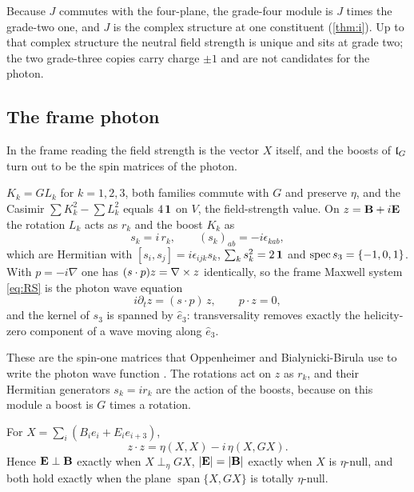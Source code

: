 Because $J$ commutes with the four-plane, the grade-four module is $J$ times the grade-two one, and $J$ is the complex structure at
one constituent (\cref{thm:i}). Up to that complex structure the neutral field strength is unique and sits at grade two; the two
grade-three copies carry charge $\pm1$ and are not candidates for the photon.

\subsection{The frame photon}

In the frame reading the field strength is the vector $X$ itself, and the boosts of $\mathfrak l_G$ turn out to be the spin matrices of the
photon.

\begin{proposition}
\label{prop:spinmatrices}
$K_k=GL_k$ for $k=1,2,3$, both families commute with $G$ and preserve $\eta$, and the Casimir $\sum K_k^2-\sum L_k^2$ equals $4\,\mathbf 1$ on
$V$, the field-strength value. On $z=\mathbf B+i\mathbf E$ the rotation $L_k$ acts as $r_k$ and the boost $K_k$ as
\[
s_k=i\,r_k,\qquad (s_k)_{ab}=-i\epsilon_{kab},
\]
which are Hermitian with $[s_i,s_j]=i\epsilon_{ijk}s_k$, $\sum_ks_k^2=2\,\mathbf 1$ and $\operatorname{spec} s_3=\{-1,0,1\}$. With $p=-i\nabla$ one has
$(s\cdot p)z=\nabla\times z$ identically, so the frame Maxwell system \eqref{eq:RS} is the photon wave equation
\[
i\partial_tz=(s\cdot p)\,z,\qquad p\cdot z=0 ,
\]
and the kernel of $s_3$ is spanned by $\hat e_3$: transversality removes exactly the helicity-zero component of a wave moving along
$\hat e_3$.
\end{proposition}

These are the spin-one matrices that Oppenheimer and Bialynicki-Birula use to write the photon wave function
\cite{Oppenheimer1931,BialynickiBirula96}. The rotations act on $z$ as $r_k$, and their Hermitian generators $s_k=ir_k$ are the action
of the boosts, because on this module a boost is $G$ times a rotation.

\begin{proposition}
\label{prop:orthframe}
For $X=\sum_i(B_ie_i+E_ie_{i+3})$,
\[
z\cdot z=\eta(X,X)-i\,\eta(X,GX).
\]
Hence $\mathbf E\perp\mathbf B$ exactly when $X\perp_\eta GX$, $|\mathbf E|=|\mathbf B|$ exactly when $X$ is $\eta$-null, and both hold exactly when the plane
$\operatorname{span}\{X,GX\}$ is totally $\eta$-null.
\end{proposition}


